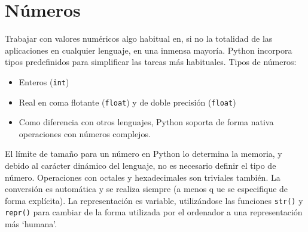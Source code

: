 \documentclass[12pt]{article} %
\begin{document}








\section{Números}

Trabajar con valores numéricos algo habitual en, si no la totalidad de las aplicaciones en cualquier lenguaje, en una inmensa mayoría. Python incorpora tipos predefinidos para simplificar las tareas más habituales.
Tipos de números:
\begin{itemize}
	\item Enteros (\verb+int+)
	\item Real en coma flotante (\verb+float+) y de doble precisión (\verb+float+)
	\item Como diferencia con otros lenguajes, Python soporta de forma nativa operaciones con números complejos.
\end{itemize}
El límite de tamaño para un número en Python lo determina la memoria, y debido al carácter dinámico del lenguaje, no es necesario definir el tipo de número. Operaciones con octales y hexadecimales son triviales también. La conversión es automática y se realiza siempre (a menos q	ue se especifique de forma explícita).
La representación es variable, utilizándose las funciones \verb+str()+ y \verb+repr()+ para cambiar de la forma utilizada por el ordenador a una representación más `humana'.
\end{document}
